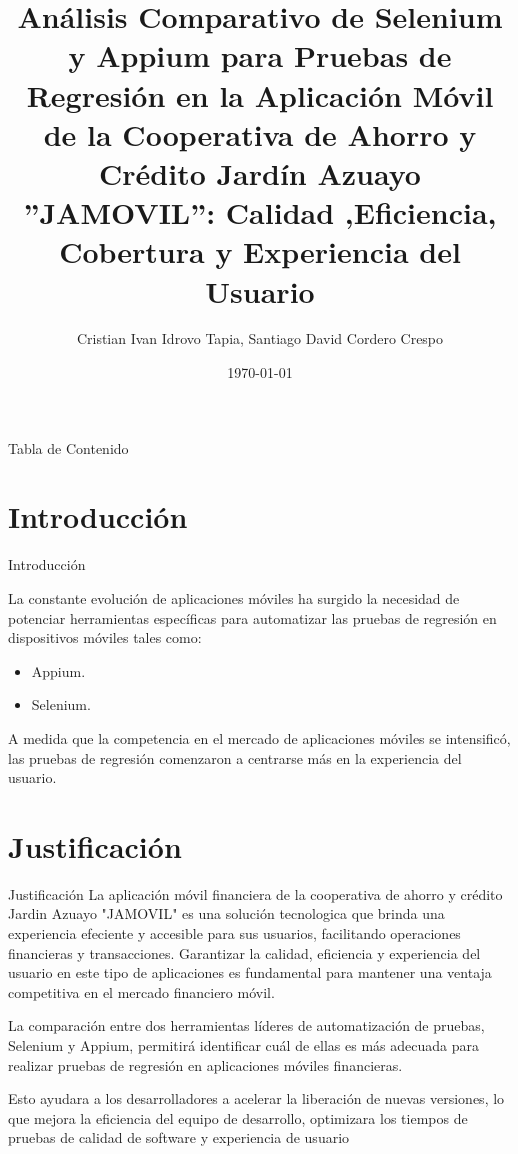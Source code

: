 \documentclass{beamer}
\begin{document}
\title{Análisis Comparativo de Selenium y Appium para Pruebas de Regresión en la Aplicación Móvil  de la Cooperativa de Ahorro y Crédito Jardín Azuayo  ”JAMOVIL”: Calidad ,Eficiencia, Cobertura y Experiencia del Usuario}
\author{Cristian Ivan Idrovo Tapia, Santiago David Cordero Crespo} 
\date{\today}

\begin{frame}
  \titlepage
\end{frame}



\begin{frame}{Tabla de Contenido}
  \tableofcontents
\end{frame}

\section{Introducción}


\begin{frame}{Introducción}

La constante evolución de aplicaciones móviles ha surgido la necesidad de potenciar herramientas específicas para automatizar las pruebas de regresión en dispositivos móviles tales como:

 \begin{itemize}
    \item Appium.
    \item Selenium.
  \end{itemize} 

A medida que la competencia en el mercado de aplicaciones móviles se intensificó, las pruebas de regresión comenzaron a centrarse más en la experiencia del usuario.
\end{frame}


\section{Justificación}

\begin{frame}{Justificación}
La  aplicación móvil financiera de la cooperativa de ahorro y crédito Jardin Azuayo "JAMOVIL" es una solución tecnologica que brinda una experiencia efeciente y accesible para sus usuarios, facilitando operaciones financieras y transacciones. Garantizar la calidad, eficiencia y experiencia del usuario en este tipo de aplicaciones es fundamental para  mantener una ventaja competitiva en el mercado financiero móvil.

La comparación entre dos herramientas líderes de automatización de pruebas, Selenium y Appium, permitirá identificar cuál de ellas es más adecuada para realizar pruebas de regresión en aplicaciones móviles financieras. 

Esto ayudara a los desarrolladores a acelerar la liberación de nuevas versiones, lo que mejora la eficiencia del equipo de desarrollo, optimizara los tiempos de pruebas de calidad de software y experiencia de usuario
\end{frame}
\end{document}
